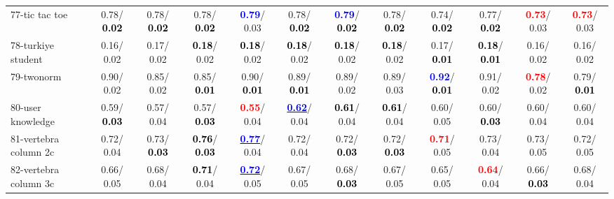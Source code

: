 \begin{table}[h]
\begin{center}
{\begin{tabular}{lc|c|c|c|c|c|c|c|c|c|c}
77-tic tac toe &   0.78/\textcolor{black}{\textbf{  0.02}} &   0.78/\textcolor{black}{\textbf{  0.02}} &   0.78/\textcolor{black}{\textbf{  0.02}} & \textcolor{blue}{\textbf{  0.79}}/  0.03 &   0.78/\textcolor{black}{\textbf{  0.02}} & \textcolor{blue}{\textbf{  0.79}}/\textcolor{black}{\textbf{  0.02}} &   0.78/\textcolor{black}{\textbf{  0.02}} &   0.74/\textcolor{black}{\textbf{  0.02}} &   0.77/\textcolor{black}{\textbf{  0.02}} & \textcolor{red}{\textbf{  0.73}}/  0.03 & \textcolor{red}{\textbf{  0.73}}/  0.03 \\
78-turkiye student &   0.16/  0.02 &   0.17/  0.02 & \textcolor{black}{\textbf{  0.18}}/  0.02 & \textcolor{black}{\textbf{  0.18}}/  0.02 & \textcolor{black}{\textbf{  0.18}}/  0.02 & \textcolor{black}{\textbf{  0.18}}/  0.02 & \textcolor{black}{\textbf{  0.18}}/  0.02 &   0.17/\textcolor{black}{\textbf{  0.01}} & \textcolor{black}{\textbf{  0.18}}/\textcolor{black}{\textbf{  0.01}} &   0.16/  0.02 &   0.16/  0.02 \\ \hline
79-twonorm &   0.90/  0.02 &   0.85/  0.02 &   0.85/\textcolor{black}{\textbf{  0.01}} &   0.90/\textcolor{black}{\textbf{  0.01}} &   0.89/\textcolor{black}{\textbf{  0.01}} &   0.89/  0.02 &   0.89/  0.03 & \textcolor{blue}{\textbf{  0.92}}/\textcolor{black}{\textbf{  0.01}} &   0.91/  0.02 & \textcolor{red}{\textbf{  0.78}}/  0.02 &   0.79/\textcolor{black}{\textbf{  0.01}} \\
80-user knowledge &   0.59/\textcolor{black}{\textbf{  0.03}} &   0.57/  0.04 &   0.57/\textcolor{black}{\textbf{  0.03}} & \textcolor{red}{\textbf{  0.55}}/  0.04 & \underline{\textcolor{blue}{\textbf{  0.62}}}/  0.04 & \textcolor{black}{\textbf{  0.61}}/  0.04 & \textcolor{black}{\textbf{  0.61}}/  0.04 &   0.60/  0.05 &   0.60/\textcolor{black}{\textbf{  0.03}} &   0.60/  0.04 &   0.60/  0.04 \\
81-vertebra column 2c &   0.72/  0.04 &   0.73/\textcolor{black}{\textbf{  0.03}} & \textcolor{black}{\textbf{  0.76}}/\textcolor{black}{\textbf{  0.03}} & \underline{\textcolor{blue}{\textbf{  0.77}}}/  0.04 &   0.72/  0.04 &   0.72/\textcolor{black}{\textbf{  0.03}} &   0.72/\textcolor{black}{\textbf{  0.03}} & \textcolor{red}{\textbf{  0.71}}/  0.05 &   0.73/  0.04 &   0.73/  0.05 &   0.72/  0.05 \\
82-vertebra column 3c &   0.66/  0.05 &   0.68/  0.04 & \textcolor{black}{\textbf{  0.71}}/  0.04 & \underline{\textcolor{blue}{\textbf{  0.72}}}/  0.05 &   0.67/  0.05 &   0.68/\textcolor{black}{\textbf{  0.03}} &   0.67/  0.05 &   0.65/  0.05 & \textcolor{red}{\textbf{  0.64}}/  0.04 &   0.66/\textcolor{black}{\textbf{  0.03}} &   0.68/  0.04 \\

\end{tabular}}
\end{center}
\end{table}
